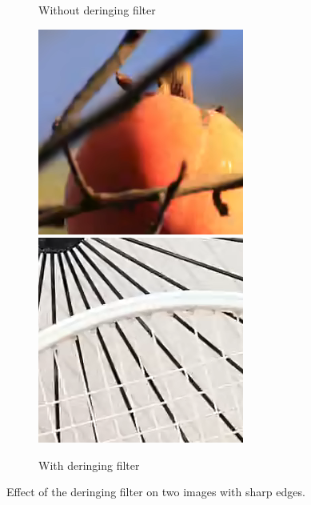 \documentclass[english,conference,10pt]{IEEEtran}
\begin{document}
\begin{figure}
\begin{subfigure}[t]{0.5\columnwidth}
		\caption{Without deringing filter}
	\end{subfigure}\begin{subfigure}[t]{0.5\columnwidth}
		\includegraphics[width=\columnwidth]{fruits_dering_crop}
		\includegraphics[width=\columnwidth]{bike_dering_crop}
		\caption{With deringing filter}
	\end{subfigure}
	\caption{Effect of the deringing filter on two images with sharp edges.}
	\label{fig:deringing}
\end{figure}
\end{document}
